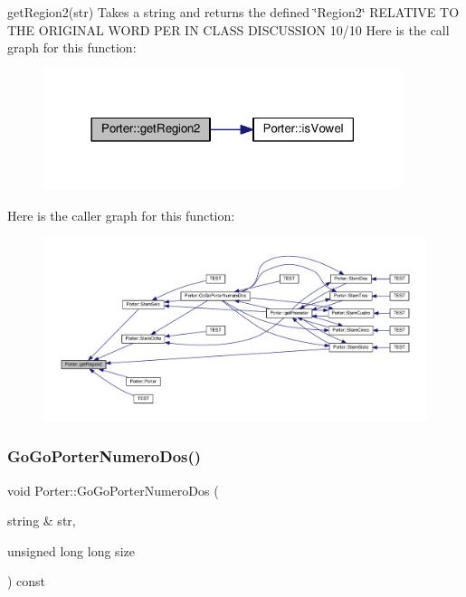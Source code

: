 get\+Region2(str) Takes a string and returns the defined \char`\"{}\+Region2\char`\"{} R\+E\+L\+A\+T\+I\+VE TO T\+HE O\+R\+I\+G\+I\+N\+AL W\+O\+RD P\+ER IN C\+L\+A\+SS D\+I\+S\+C\+U\+S\+S\+I\+ON 10/10 Here is the call graph for this function\+:
\nopagebreak
\begin{figure}[H]
\begin{center}
\leavevmode
\includegraphics[width=297pt]{class_porter_a1420c413bb564a22e4fc0c6627e1870b_cgraph}
\end{center}
\end{figure}
Here is the caller graph for this function\+:
\nopagebreak
\begin{figure}[H]
\begin{center}
\leavevmode
\includegraphics[width=350pt]{class_porter_a1420c413bb564a22e4fc0c6627e1870b_icgraph}
\end{center}
\end{figure}
\mbox{\label{class_porter_af7f1d6892ca1ed4e22986c48be2365d6}} 
\subsubsection{\texorpdfstring{Go\+Go\+Porter\+Numero\+Dos()}{GoGoPorterNumeroDos()}}
{\footnotesize\ttfamily void Porter\+::\+Go\+Go\+Porter\+Numero\+Dos (\begin{DoxyParamCaption}\item[{string \&}]{str,  }\item[{unsigned long long}]{size }\end{DoxyParamCaption}) const}

